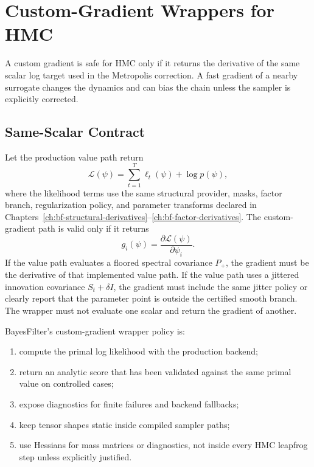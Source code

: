\chapter{Custom-Gradient Wrappers for HMC}
\label{ch:bf-custom-gradient-wrappers}

A custom gradient is safe for HMC only if it returns the derivative of the same
scalar log target used in the Metropolis correction.  A fast gradient of a
nearby surrogate changes the dynamics and can bias the chain unless the sampler
is explicitly corrected.

\section{Same-Scalar Contract}
\label{sec:bf-custom-gradient-same-scalar}

Let the production value path return
\begin{equation}
\label{eq:bf-custom-primal-target}
  \mathcal{L}(\psi)
  =
  \sum_{t=1}^T \ell_t(\psi) + \log p(\psi),
\end{equation}
where the likelihood terms use the same structural provider, masks, factor
branch, regularization policy, and parameter transforms declared in
Chapters~\ref{ch:bf-structural-derivatives}--\ref{ch:bf-factor-derivatives}.
The custom-gradient path is valid only if it returns
\begin{equation}
\label{eq:bf-custom-gradient-target}
  g_i(\psi)=\frac{\partial \mathcal{L}(\psi)}{\partial\psi_i}.
\end{equation}
If the value path evaluates a floored spectral covariance $P_+$, the gradient
must be the derivative of that implemented value path.  If the value path uses a
jittered innovation covariance $S_t+\delta I$, the gradient must include the
same jitter policy or clearly report that the parameter point is outside the
certified smooth branch.  The wrapper must not evaluate one scalar and return the
gradient of another.

BayesFilter's custom-gradient wrapper policy is:
\begin{enumerate}[label=(\roman*)]
  \item compute the primal log likelihood with the production backend;
  \item return an analytic score that has been validated against the same
    primal value on controlled cases;
  \item expose diagnostics for finite failures and backend fallbacks;
  \item keep tensor shapes static inside compiled sampler paths;
  \item use Hessians for mass matrices or diagnostics, not inside every HMC
    leapfrog step unless explicitly justified.
\end{enumerate}

